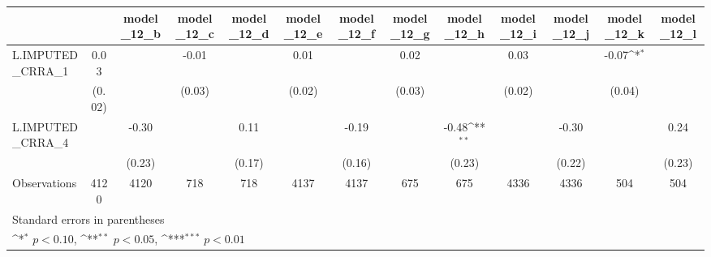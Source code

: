 {
\def\sym#1{\ifmmode^{#1}\else\(^{#1}\)\fi}
\begin{tabular}{l*{12}{c}}
\toprule
                &\multicolumn{1}{c}{}&\multicolumn{1}{c}{model\_12\_b}&\multicolumn{1}{c}{model\_12\_c}&\multicolumn{1}{c}{model\_12\_d}&\multicolumn{1}{c}{model\_12\_e}&\multicolumn{1}{c}{model\_12\_f}&\multicolumn{1}{c}{model\_12\_g}&\multicolumn{1}{c}{model\_12\_h}&\multicolumn{1}{c}{model\_12\_i}&\multicolumn{1}{c}{model\_12\_j}&\multicolumn{1}{c}{model\_12\_k}&\multicolumn{1}{c}{model\_12\_l}\\
\midrule
L.IMPUTED\_CRRA\_1&     0.03         &                  &    -0.01         &                  &     0.01         &                  &     0.02         &                  &     0.03         &                  &    -0.07\sym{*}  &                  \\
                &   (0.02)         &                  &   (0.03)         &                  &   (0.02)         &                  &   (0.03)         &                  &   (0.02)         &                  &   (0.04)         &                  \\
\addlinespace
L.IMPUTED\_CRRA\_4&                  &    -0.30         &                  &     0.11         &                  &    -0.19         &                  &    -0.48\sym{**} &                  &    -0.30         &                  &     0.24         \\
                &                  &   (0.23)         &                  &   (0.17)         &                  &   (0.16)         &                  &   (0.23)         &                  &   (0.22)         &                  &   (0.23)         \\
\midrule
Observations    &     4120         &     4120         &      718         &      718         &     4137         &     4137         &      675         &      675         &     4336         &     4336         &      504         &      504         \\
\bottomrule
\multicolumn{13}{l}{\footnotesize Standard errors in parentheses}\\
\multicolumn{13}{l}{\footnotesize \sym{*} \(p<0.10\), \sym{**} \(p<0.05\), \sym{***} \(p<0.01\)}\\
\end{tabular}
}
